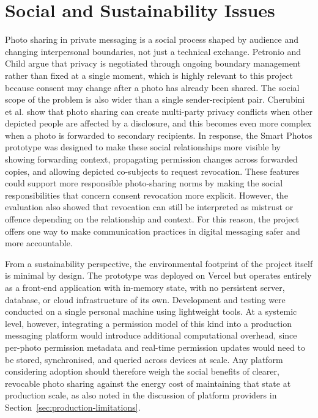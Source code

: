 \section{Social and Sustainability Issues}
Photo sharing in private messaging is a social process shaped by audience and changing interpersonal boundaries, not just a technical exchange. Petronio and Child \cite{petronio_cpm_2020} argue that privacy is negotiated through ongoing boundary management rather than fixed at a single moment, which is highly relevant to this project because consent may change after a photo has already been shared. The social scope of the problem is also wider than a single sender-recipient pair. Cherubini et al. \cite{cherubini_2021} show that photo sharing can create multi-party privacy conflicts when other depicted people are affected by a disclosure, and this becomes even more complex when a photo is forwarded to secondary recipients. In response, the Smart Photos prototype was designed to make these social relationships more visible by showing forwarding context, propagating permission changes across forwarded copies, and allowing depicted co-subjects to request revocation. These features could support more responsible photo-sharing norms by making the social responsibilities that concern consent revocation more explicit. However, the evaluation also showed that revocation can still be interpreted as mistrust or offence depending on the relationship and context. For this reason, the project offers one way to make communication practices in digital messaging safer and more accountable.

From a sustainability perspective, the environmental footprint of the project itself is minimal by design. The prototype was deployed on Vercel but operates entirely as a front-end application with in-memory state, with no persistent server, database, or cloud infrastructure of its own. Development and testing were conducted on a single personal machine using lightweight tools. At a systemic level, however, integrating a permission model of this kind into a production messaging platform would introduce additional computational overhead, since per-photo permission metadata and real-time permission updates would need to be stored, synchronised, and queried across devices at scale. Any platform considering adoption should therefore weigh the social benefits of clearer, revocable photo sharing against the energy cost of maintaining that state at production scale, as also noted in the discussion of platform providers in Section~\ref{sec:production-limitations}.

